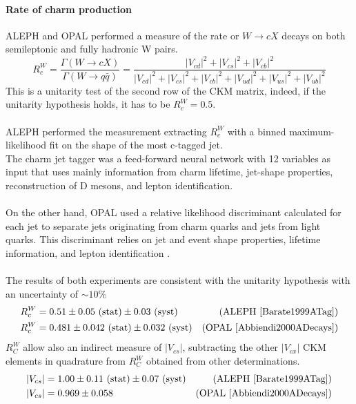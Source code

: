 \paragraph*{Rate of charm production}
ALEPH and OPAL performed a measure of the rate or $W\to cX$ decays on both semileptonic and fully hadronic W pairs.
\begin{equation}
    R_c^W=\frac{\Gamma(W\to cX)}{\Gamma(W\to q\bar{q})}=\frac{|V_{cd}|^2+|V_{cs}|^2+|V_{cb}|^2}{|V_{cd}|^2+|V_{cs}|^2+|V_{cb}|^2+|V_{ud}|^2+|V_{us}|^2+|V_{ub}|^2}
\end{equation}
This is a unitarity test of the second row of the CKM matrix, indeed, if the unitarity hypothesis holds, it has to be $R_c^W=0.5$.
\\
\\
ALEPH performed the measurement extracting $R_c^W$ with a binned maximum-likelihood fit on the shape of the most c-tagged jet\cite{Barate1999ATag}.\\
The charm jet tagger was a feed-forward neural network with 12 variables as input that uses mainly information from charm lifetime, jet-shape properties, reconstruction of D mesons, and lepton identification.\\
\\
On the other hand, OPAL used a relative likelihood discriminant calculated for each jet to separate jets originating from charm quarks and jets from light quarks. This discriminant relies on jet and event shape properties, lifetime information, and lepton identification \cite{Abbiendi2000ADecays}.
\\
\\
The results of both experiments are consistent with the unitarity hypothesis with an uncertainty of $\sim 10\%$
\begin{equation}
\begin{aligned}
    R_c^W&=0.51 \pm 0.05 \text{ (stat)} \pm 0.03 \text{ (syst)} & \text{(ALEPH \cite{Barate1999ATag})}\\
    R_c^W&=0.481 \pm 0.042 \text{ (stat)} \pm 0.032 \text{ (syst)} & \text{(OPAL \cite{Abbiendi2000ADecays})}
\end{aligned}
\end{equation}\vspace{-0.001cm}
$R_C^W$ allow also an indirect measure of $|V_{cs}|$, subtracting the other $|V_{cx}|$ CKM elements in quadrature from $R_C^W$ obtained from other determinations.
\begin{equation}
\begin{aligned}
    |V_{cs}|&=1.00\pm0.11  \text{ (stat)} \pm 0.07 \text{ (syst)} & \text{(ALEPH \cite{Barate1999ATag})}\\
    |V_{cs}|&=0.969\pm0.058 & \text{(OPAL \cite{Abbiendi2000ADecays})}
\end{aligned}
\end{equation}
